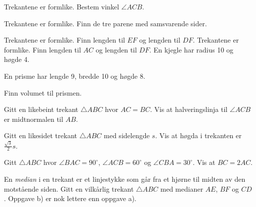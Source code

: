 



	
\opgt

Trekantene er formlike. Bestem vinkel $ \angle ACB $. \vs
{}

Trekantene er formlike. Finn de tre parene med samsvarende sider.

Trekantene er formlike. Finn lengden til $ EF $ og lengden til $ DF $.
\newpage
{}
Trekantene er formlike. Finn lengden til $ AC $ og lengden til $ DF $.
\newpage
{}
En kjegle har radius 10 og høgde 4.

En prisme har lengde 9, bredde 10 og høgde 8. \os

Finn volumet til prismen.
\newpage

Gitt en likebeint trekant $\triangle {ABC} $ hvor $ AC=BC $. Vis at halveringslinja til $ \angle ACB $ er midtnormalen til $ AB $.

Gitt en likesidet trekant $ \triangle ABC $ med sidelengde $ s $. Vis at høgda i trekanten er $ \frac{\sqrt{3}}{2}s $.

Gitt $ \triangle ABC $ hvor $ \angle BAC=90^\circ $, $ \angle ACB=60^\circ $ og $ \angle CBA=30^\circ $. Vis at $ BC=2AC $.

En \textit{median} i en trekant er et linjestykke som går fra et hjørne til midten av den motstående siden. 
Gitt en vilkårlig trekant $ \triangle ABC $ med medianer $ AE $, $ BF $ og  $ CD $. 
\mer Oppgave b) er nok lettere enn oppgave a).



